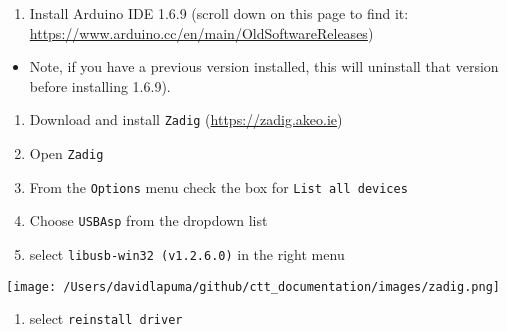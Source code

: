\documentclass[
]{article}
\providecommand{\tightlist}{%
  \setlength{\itemsep}{0pt}\setlength{\parskip}{0pt}}
\begin{document}
\begin{enumerate}
\def\labelenumi{\arabic{enumi}.}
\tightlist
\item
  Install Arduino IDE 1.6.9 (scroll down on this page to find it:
  \url{https://www.arduino.cc/en/main/OldSoftwareReleases})
\end{enumerate}

\begin{itemize}
\tightlist
\item
  Note, if you have a previous version installed, this will uninstall
  that version before installing 1.6.9).
\end{itemize}

\begin{enumerate}
\def\labelenumi{\arabic{enumi}.}
\setcounter{enumi}{1}
\tightlist
\item
  Download and install \texttt{Zadig} (\url{https://zadig.akeo.ie})
\item
  Open \texttt{Zadig}
\item
  From the \texttt{Options} menu check the box for
  \texttt{List\ all\ devices}
\item
  Choose \texttt{USBAsp} from the dropdown list
\item
  select \texttt{libusb-win32\ (v1.2.6.0)} in the right menu
\end{enumerate}

\texttt{[image: /Users/davidlapuma/github/ctt\_documentation/images/zadig.png]}

\begin{enumerate}
\def\labelenumi{\arabic{enumi}.}
\setcounter{enumi}{6}
\tightlist
\item
  select \texttt{reinstall\ driver}
\end{enumerate}
\end{document}
